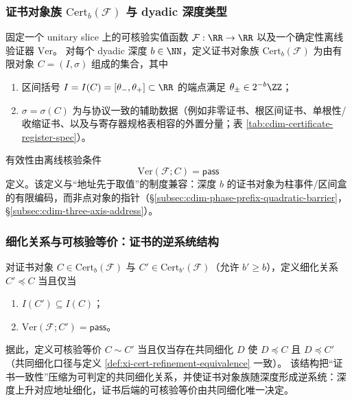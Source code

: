 \subsubsection{证书对象族 \texorpdfstring{$\mathrm{Cert}_b(\mathcal F)$}{Certb(F)} 与 dyadic 深度类型}
固定一个 unitary slice 上的可核验实值函数 \(\mathcal F:\RR\to\RR\) 以及一个确定性离线验证器 \(\mathrm{Ver}\)。
对每个 dyadic 深度 \(b\in\NN\)，定义证书对象族 \(\mathrm{Cert}_b(\mathcal F)\) 为由有限对象 \(C=(I,\sigma)\) 组成的集合，其中
\begin{enumerate}
  \item 区间括号 \(I=I(C)=[\theta_-,\theta_+]\subset\RR\) 的端点满足 \(\theta_\pm\in 2^{-b}\ZZ\)；
  \item \(\sigma=\sigma(C)\) 为与协议一致的辅助数据（例如非零证书、根区间证书、单根性/收缩证书、以及与寄存器规格表相容的外置分量；表 \ref{tab:cdim-certificate-register-spec}）。
\end{enumerate}
有效性由离线核验条件
\[
\mathrm{Ver}(\mathcal F;C)=\mathsf{pass}
\]
定义。该定义与“地址先于取值”的制度兼容：深度 \(b\) 的证书对象为柱事件/区间盒的有限编码，而非点对象的指针（\S\ref{subsec:cdim-phase-prefix-quadratic-barrier}，\S\ref{subsec:cdim-three-axis-address}）。

\subsubsection{细化关系与可核验等价：证书的逆系统结构}
对证书对象 \(C\in\mathrm{Cert}_b(\mathcal F)\) 与 \(C'\in\mathrm{Cert}_{b'}(\mathcal F)\)（允许 \(b'\ge b\)），定义细化关系 \(C'\preceq C\) 当且仅当
\begin{enumerate}
  \item \(I(C')\subseteq I(C)\)；
  \item \(\mathrm{Ver}(\mathcal F;C')=\mathsf{pass}\)。
\end{enumerate}
据此，定义可核验等价 \(C\sim C'\) 当且仅当存在共同细化 \(D\) 使 \(D\preceq C\) 且 \(D\preceq C'\)（共同细化口径与定义 \ref{def:xi-cert-refinement-equivalence} 一致）。
该结构把“证书一致性”压缩为可判定的共同细化关系，并使证书对象族随深度形成逆系统：深度上升对应地址细化，证书后端的可核验等价由共同细化唯一决定。

